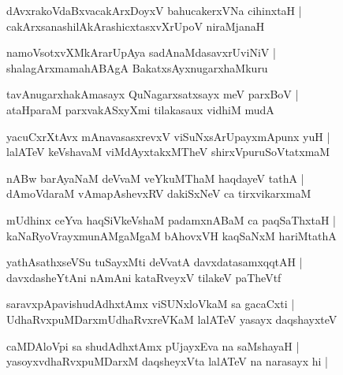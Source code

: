 \documentclass[twoside,12pt,openright]{book}
\newcounter{shloka}[chapter]
\begin{document}
\begin{shloka}%
dAvxrakoVdaBxvacakArxDoyxV bahucakerxVNa cihinxtaH |\\
cakArxsanashilAkArashicxtasxvXrUpoV niraMjanaH
\end{shloka}

\begin{shloka}%
namoVsotxvXMkArarUpAya sadAnaMdasavxrUviNiV |\\
shalagArxmamahABAgA BakatxsAyxnugarxhaMkuru
\end{shloka}

\begin{shloka}%
tavAnugarxhakAmasayx QuNagarxsatxsayx meV parxBoV |\\
ataHparaM parxvakASxyXmi tilakasaux vidhiM mudA 
\end{shloka}

\begin{shloka}%
yacuCxrXtAvx mAnavasasxrevxV viSuNxsArUpayxmApunx yuH |\\
lalATeV keVshavaM viMdAyxtakxMTheV shirxVpuruSoVtatxmaM 
\end{shloka}

\begin{shloka}%
nABw barAyaNaM deVvaM veYkuMThaM haqdayeV tathA |\\
dAmoVdaraM vAmapAshevxRV dakiSxNeV ca tirxvikarxmaM 
\end{shloka}

\begin{shloka}%
mUdhinx ceYva haqSiVkeVshaM padamxnABaM ca paqSaThxtaH |\\
kaNaRyoVrayxmunAMgaMgaM bAhovxVH kaqSaNxM hariMtathA 
\end{shloka}

\begin{shloka}%
yathAsathxseVSu tuSayxMti deVvatA davxdatasamxqqtAH |\\
davxdasheYtAni nAmAni kataRveyxV tilakeV paTheVtf 
\end{shloka}

\begin{shloka}%
saravxpApavishudAdhxtAmx viSUNxloVkaM sa gacaCxti |\\
UdhaRvxpuMDarxmUdhaRvxreVKaM lalATeV yasayx daqshayxteV 
\end{shloka}

\begin{shloka}%
caMDAloVpi sa shudAdhxtAmx pUjayxEva na saMshayaH |\\
yasoyxvdhaRvxpuMDarxM daqsheyxVta lalATeV na narasayx hi |\\
\end{shloka}
\end{document}
